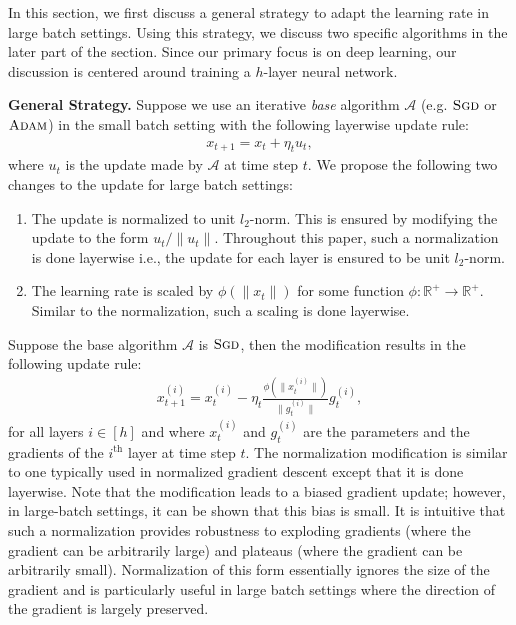 
In this section, we first discuss a general strategy to adapt the learning rate in large batch settings.  Using this strategy, we discuss two specific algorithms in the later part of the section. Since our primary focus is on deep learning, our discussion is centered around training a $h$-layer neural network.

{\bf General Strategy.} Suppose we use an iterative \emph{base} algorithm $\mathcal{A}$ (e.g. $\textsc{Sgd}$ or $\textsc{Adam}$) in the small batch setting with the following layerwise update rule:
\begin{align*}
x_{t+1} = x_t + \eta_t u_t, 
\end{align*} 
where $u_t$ is the update made by $\mathcal{A}$ at time step $t$. We propose the following two changes to the update for large batch settings:
\begin{enumerate}
\item The update is normalized to unit $l_2$-norm. This is ensured by modifying the update to the form $u_t/\|u_t\|$. Throughout this paper, such a normalization is done layerwise i.e., the update for each layer is ensured to be unit $l_2$-norm.
\item The learning rate is scaled by $\phi(\|x_t\|)$ for some function $\phi:\mathbb{R}^{+} \rightarrow \mathbb{R}^+$. Similar to the normalization, such a scaling is done layerwise.
\end{enumerate}
Suppose the base algorithm $\mathcal{A}$ is $\textsc{Sgd}$, then the modification results in the following update rule:
\begin{align}
x_{t+1}^{(i)} = x_t^{(i)} - \eta_t \frac{\phi(\|x_t^{(i)}\|)}{\|g_t^{(i)}\|} g_t^{(i)} ,
\end{align}
for all layers $i \in [h]$ and where $x^{(i)}_t$ and $g^{(i)}_t$ are the parameters and the gradients of the $i^{\text{th}}$ layer at time step $t$.  The normalization modification is similar to one typically used in normalized gradient descent except that it is done layerwise. Note that the modification leads to a biased gradient update; however, in large-batch settings, it can be shown that this bias is small.  It is intuitive  that such a normalization provides robustness to exploding gradients (where the gradient can be arbitrarily large) and plateaus (where the gradient can be arbitrarily small). Normalization of this form essentially ignores the size of the gradient and is particularly useful in large batch settings where the direction of the gradient is largely preserved.


